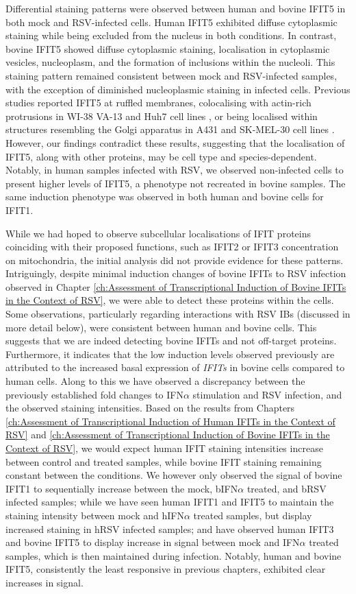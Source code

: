 Differential staining patterns were observed between human and bovine IFIT5 in both mock and RSV-infected cells. Human IFIT5 exhibited diffuse cytoplasmic staining while being excluded from the nucleus in both conditions. In contrast, bovine IFIT5 showed diffuse cytoplasmic staining, localisation in cytoplasmic vesicles, nucleoplasm, and the formation of inclusions within the nucleoli. This staining pattern remained consistent between mock and RSV-infected samples, with the exception of diminished nucleoplasmic staining in infected cells. Previous studies reported IFIT5 at ruffled membranes, colocalising with actin-rich protrusions in WI-38 VA-13 and Huh7 cell lines \cite{Katibah2013TRNAIFIT5}, or being localised within structures resembling the Golgi apparatus in A431 and SK-MEL-30 cell lines \cite{Thul2017AProteome}. However, our findings contradict these results, suggesting that the localisation of IFIT5, along with other proteins, may be cell type and species-dependent. Notably, in human samples infected with RSV, we observed non-infected cells to present higher levels of IFIT5, a phenotype not recreated in bovine samples. The same induction phenotype was observed in both human and bovine cells for IFIT1.

While we had hoped to observe subcellular localisations of IFIT proteins coinciding with their proposed functions, such as IFIT2 or IFIT3 concentration on mitochondria, the initial analysis did not provide evidence for these patterns. Intriguingly, despite minimal induction changes of bovine IFITs to RSV infection observed in Chapter \ref{ch:Assessment of Transcriptional Induction of Bovine IFITs in the Context of RSV}, we were able to detect these proteins within the cells. Some observations, particularly regarding interactions with RSV IBs (discussed in more detail below), were consistent between human and bovine cells. This suggests that we are indeed detecting bovine IFITs and not off-target proteins. Furthermore, it indicates that the low induction levels observed previously are attributed to the increased basal expression of \textit{IFITs} in bovine cells compared to human cells. Along to this we have observed a discrepancy between the previously established fold changes to IFN$\alpha$ stimulation and RSV infection, and the observed staining intensities. Based on the results from Chapters \ref{ch:Assessment of Transcriptional Induction of Human IFITs in the Context of RSV} and \ref{ch:Assessment of Transcriptional Induction of Bovine IFITs in the Context of RSV}, we would expect human IFIT staining intensities increase between control and treated samples, while bovine IFIT staining remaining constant between the conditions. We however only observed the signal of bovine IFIT1 to sequentially increase between the mock, bIFN$\alpha$ treated, and bRSV infected samples; while we have seen human IFIT1 and IFIT5 to maintain the staining intensity between mock and hIFN$\alpha$ treated samples, but display increased staining in hRSV infected samples; and have observed human IFIT3 and bovine IFIT5 to display increase in signal between mock and IFN$\alpha$ treated samples, which is then maintained during infection. Notably, human and bovine IFIT5, consistently the least responsive in previous chapters, exhibited clear increases in signal. 

